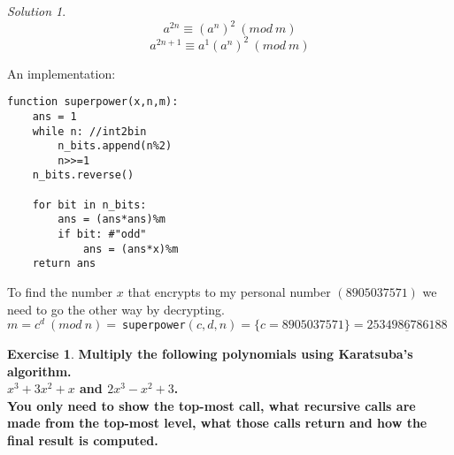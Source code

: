 \documentclass[a4paper,twoside=false,abstract=false,numbers=noenddot,
titlepage=false,headings=small,parskip=half,version=last]{scrartcl}
\theoremstyle{definition}
\newtheorem{exercise}{Exercise}
\theoremstyle{remark}
\newtheorem*{solution}{Solution}
\begin{document}
\begin{solution}
\begin{equation}
    a^{2n} \equiv (a^n)^2 \ ( mod \ m)
\end{equation}
\begin{equation}
    a^{2n+1} \equiv a^1(a^n)^2 \ ( mod \ m )
\end{equation}

An implementation:
\begin{verbatim}
function superpower(x,n,m):
    ans = 1
    while n: //int2bin
        n_bits.append(n%2)
        n>>=1
    n_bits.reverse()

    for bit in n_bits:
        ans = (ans*ans)%m 
        if bit: #"odd"
            ans = (ans*x)%m
    return ans
\end{verbatim}

To find the number $x$ that encrypts to my personal number $(8905037571)$ we
need to go the other way by decrypting. \\
$m=c^d \ (mod \ n) =\
$\verb+superpower+$(c,d,n)=\{c=8905037571\}=\underline{2534986786188}$
\end{solution}
\clearpage
\begin{exercise}
{\bf
Multiply the following polynomials using Karatsuba's algorithm.\\
$x^3+3x^2+x$ and $2x^3-x^2+3$.\\
You only need to show the top-most call, what recursive calls are made from the
top-most level, what those calls return and how the final result is computed.
}
\end{exercise}
\end{document}
